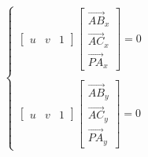 \documentclass{article}
\begin{document}
\thispagestyle{empty}

$$
\left\{
\begin{array}{lcr}
\begin{bmatrix}u & v & 1\end{bmatrix}\begin{bmatrix}\overrightarrow{AB}_x \\ \overrightarrow{AC}_x \\ \overrightarrow{PA}_x\end{bmatrix} = 0\\
~\\
\begin{bmatrix}u & v & 1\end{bmatrix}\begin{bmatrix}\overrightarrow{AB}_y \\ \overrightarrow{AC}_y \\ \overrightarrow{PA}_y\end{bmatrix} = 0
\end{array}
\right.
$$
\end{document}
